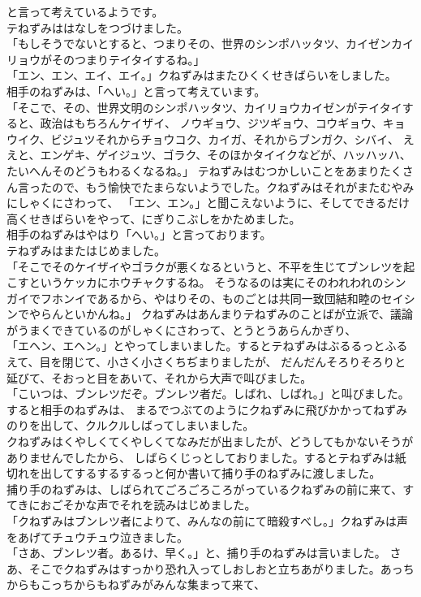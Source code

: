 \documentclass[
a4paper,
10pt,
book]
{tarticle}
\begin{document}
\newpage
\thispagestyle{fancy}
\fancyhead[R]{\empty}
と言って考えているようです。\\
\indent テねずみははなしをつづけました。\\
「もしそうでないとすると、つまりその、世界のシンポハッタツ、カイゼンカイリョウがそのつまりテイタイするね。」\\
「エン、エン、エイ、エイ。」クねずみはまたひくくせきばらいをしました。\\
\indent 相手のねずみは、「へい。」と言って考えています。\\
「そこで、その、世界文明のシンポハッタツ、カイリョウカイゼンがテイタイすると、政治はもちろんケイザイ、
ノウギョウ、ジツギョウ、コウギョウ、キョウイク、ビジュツそれからチョウコク、カイガ、それからブンガク、シバイ、
ええと、エンゲキ、ゲイジュツ、ゴラク、そのほかタイイクなどが、ハッハッハ、たいへんそのどうもわるくなるね。」
テねずみはむつかしいことをあまりたくさん言ったので、もう愉快でたまらないようでした。クねずみはそれがまたむやみにしゃくにさわって、
「エン、エン。」と聞こえないように、そしてできるだけ高くせきばらいをやって、にぎりこぶしをかためました。\\
\indent 相手のねずみはやはり「へい。」と言っております。\\
\indent テねずみはまたはじめました。\\
「そこでそのケイザイやゴラクが悪くなるというと、不平を生じてブンレツを起こすというケッカにホウチャクするね。
そうなるのは実にそのわれわれのシンガイでフホンイであるから、やはりその、ものごとは共同一致団結和睦のセイシンでやらんといかんね。」
\newpage
\thispagestyle{fancy}
\fancyhead[R]{\empty}
\indent クねずみはあんまりテねずみのことばが立派で、議論がうまくできているのがしゃくにさわって、とうとうあらんかぎり、\\
「エヘン、エヘン。」とやってしまいました。するとテねずみはぶるるっとふるえて、目を閉じて、小さく小さくちぢまりましたが、
だんだんそろりそろりと延びて、そおっと目をあいて、それから大声で叫びました。\\
「こいつは、ブンレツだぞ。ブンレツ者だ。しばれ、しばれ。」と叫びました。すると相手のねずみは、
まるでつぶてのようにクねずみに飛びかかってねずみのりを出して、クルクルしばってしまいました。\\
\indent クねずみはくやしくてくやしくてなみだが出ましたが、どうしてもかないそうがありませんでしたから、
しばらくじっとしておりました。するとテねずみは紙切れを出してするするするっと何か書いて捕り手のねずみに渡しました。\\
\indent 捕り手のねずみは、しばられてごろごろころがっているクねずみの前に来て、すてきにおごそかな声でそれを読みはじめました。\\
「クねずみはブンレツ者によりて、みんなの前にて暗殺すべし。」クねずみは声をあげてチュウチュウ泣きました。\\
「さあ、ブンレツ者。あるけ、早く。」と、捕り手のねずみは言いました。
さあ、そこでクねずみはすっかり恐れ入ってしおしおと立ちあがりました。あっちからもこっちからもねずみがみんな集まって来て、
\end{document}
